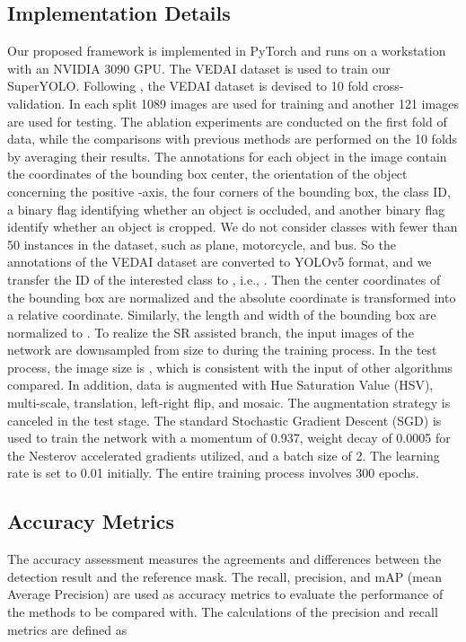 \subsection{Implementation Details}
Our proposed framework is implemented in PyTorch and runs on a workstation with an NVIDIA 3090 GPU. The VEDAI dataset is used to train our SuperYOLO. Following \cite{9273212}, the VEDAI dataset is devised to 10 fold cross-validation. In each split 1089 images are used for training and another 121 images are used for testing. The ablation experiments are conducted on the first fold of data, while the comparisons with previous methods are performed on the 10 folds by averaging their results. The annotations for each object in the image contain the coordinates of the bounding box center, the orientation of the object concerning the positive -axis, the four corners of the bounding box, the class ID, a binary flag identifying whether an object is occluded, and another binary flag identify whether an object is cropped. We do not consider classes with fewer than 50 instances in the dataset, such as plane, motorcycle, and bus. So the annotations of the VEDAI dataset are converted to YOLOv5 format, and we transfer the ID of the interested class to , i.e., . Then the center coordinates of the bounding box are normalized and the absolute coordinate is transformed into a relative coordinate. Similarly, the length and width of the bounding box are normalized to . To realize the SR assisted branch, the input images of the network are downsampled from  size to  during the training process. In the test process, the image size is , which is consistent with the input of other algorithms compared. In addition, data is augmented with Hue Saturation Value (HSV), multi-scale, translation, left-right flip, and mosaic. The augmentation strategy is canceled in the test stage. The standard Stochastic Gradient Descent (SGD) \cite{bottou2010large} is used to train the network with a momentum of 0.937, weight decay of 0.0005 for the Nesterov accelerated gradients utilized, and a batch size of 2. The learning rate is set to 0.01 initially. The entire training process involves 300 epochs. 




\subsection{Accuracy Metrics}
The accuracy assessment measures the agreements and differences between the detection result and the reference mask. The recall, precision, and mAP (mean Average Precision) are used as accuracy metrics to evaluate the performance of the methods to be compared with. The calculations of the precision and recall metrics are defined as


